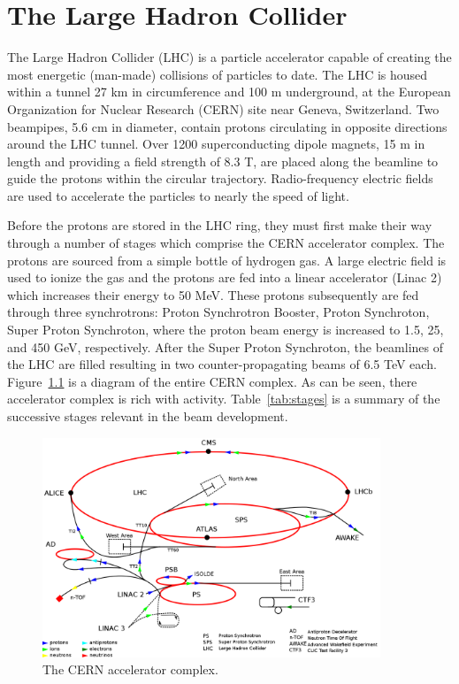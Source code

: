\chapter{The Large Hadron Collider}
\label{chap:lhc}

The Large Hadron Collider (LHC) is a particle accelerator capable of creating the most energetic (man-made) collisions of particles to date. The LHC is housed within a tunnel 27 km in circumference and 100 m underground, at the European Organization for Nuclear Research (CERN) site near Geneva, Switzerland. Two beampipes, 5.6 cm in diameter, contain protons circulating in opposite directions around the LHC tunnel. Over 1200 superconducting dipole magnets, 15 m in length and providing a field strength of 8.3 T, are placed along the beamline to guide the protons within the circular trajectory. Radio-frequency electric fields are used to accelerate the particles to nearly the speed of light.

Before the protons are stored in the LHC ring, they must first make their way through a number of stages which comprise the CERN accelerator complex. The protons are sourced from a simple bottle of hydrogen gas. A large electric field is used to ionize the gas and the protons are fed into a linear accelerator (Linac 2) which increases their energy to 50 MeV. These protons subsequently are fed through three synchrotrons: Proton Synchrotron Booster, Proton Synchroton, Super Proton Synchroton, where the proton beam energy is increased to 1.5, 25, and 450 GeV, respectively. After the Super Proton Synchroton, the beamlines of the LHC are filled resulting in two counter-propagating beams of 6.5 TeV each. Figure~\ref{fig:lhc} is a diagram of the entire CERN complex. As can be seen, there accelerator complex is rich with activity. Table~\ref{tab:stages} is a summary of the successive stages relevant in the beam development.

\begin{figure}
\centering
\includegraphics[width=0.9\textwidth]{figs/lhcschematic.png}
\caption{The CERN accelerator complex.}
\label{fig:lhc}
\end{figure}

